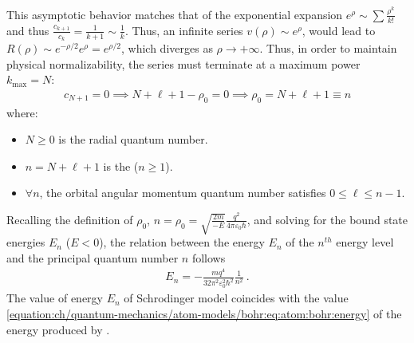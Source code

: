 \documentclass[letterpaper,10pt,english]{jupyterBook}
\begin{document}
\sphinxAtStartPar
This asymptotic behavior matches that of the exponential expansion \(e^\rho \sim \sum \frac{\rho^k}{k!}\) and thus \(\frac{c_{k+1}}{c_k} = \frac{1}{k+1} \sim \frac{1}{k}\).
Thus, an infinite series \(v(\rho) \sim e^\rho\), would lead to \(R(\rho) \sim e^{-\rho/2} e^\rho = e^{\rho/2}\), which diverges as \(\rho \to +\infty\).
Thus, in order to maintain physical normalizability, the series must terminate at a maximum power \(k_{\max} = N\):
\begin{equation*}
\begin{split}c_{N+1} = 0 \implies N + \ell + 1 - \rho_0 = 0 \implies \rho_0 = N + \ell + 1 \equiv n\end{split}
\end{equation*}
\sphinxAtStartPar
where:
\begin{itemize}
\item {} 
\sphinxAtStartPar
\(N \ge 0\) is the radial quantum number.

\item {} 
\sphinxAtStartPar
\(n = N + \ell + 1\) is the  (\(n \ge 1\)).

\item {} 
\sphinxAtStartPar
\(\forall n\), the orbital angular momentum quantum number satisfies \(0 \le \ell \le n - 1\).

\end{itemize}

\sphinxAtStartPar
{} Recalling the definition of \(\rho_0\), \(n = \rho_0 = \sqrt{\frac{2m}{-E}} \frac{q^2}{4\pi \varepsilon_0 \hbar}\), and solving for the bound state energies \(E_n\) (\(E < 0\)), the relation between the energy \(E_n\) of the \(n^{th}\) energy level and the principal quantum number \(n\) follows
\begin{equation}\label{equation:ch/quantum-mechanics/atom-models/schrodinger-analytical-sln:eq:atom:schrodinger:energy:details}
\begin{split}E_n = - \frac{m q^4}{32 \pi^2 \varepsilon_0^2 \hbar^2} \frac{1}{n^2} \ .\end{split}
\end{equation}
\sphinxAtStartPar
{} The value of energy \(E_n\) of Schrodinger model coincides with the value \eqref{equation:ch/quantum-mechanics/atom-models/bohr:eq:atom:bohr:energy} of the energy produced by {\hyperref[\detokenize{ch/quantum-mechanics/atom-models/bohr:quantum-mechanics-atom-models-bohr}]{}}.
\end{document}
